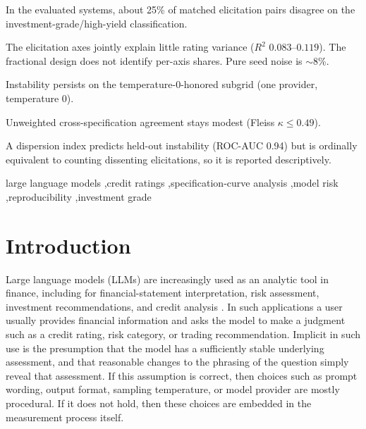 \documentclass[a4paper,fleqn]{cas-sc}
\begin{document}
\begin{highlights}
\item In the evaluated systems, about 25\% of matched elicitation pairs disagree on the investment-grade/high-yield classification.
\item The elicitation axes jointly explain little rating variance ($R^2$ $0.083$--$0.119$). The fractional design does not identify per-axis shares. Pure seed noise is $\sim$8\%.
\item Instability persists on the temperature-0-honored subgrid (one provider, temperature 0).
\item Unweighted cross-specification agreement stays modest (Fleiss $\kappa\le0.49$).
\item A dispersion index predicts held-out instability (ROC-AUC 0.94) but is ordinally equivalent to counting dissenting elicitations, so it is reported descriptively.
\end{highlights}

\begin{keywords}
large language models \sep credit ratings \sep specification-curve analysis \sep model risk \sep reproducibility \sep investment grade
\end{keywords}

\maketitle

\section{Introduction}
Large language models (LLMs) are increasingly used as an analytic tool in finance, including for
financial-statement interpretation, risk assessment, investment recommendations, and credit analysis
\citep{hens2025risk}. In such applications a user usually provides financial information and asks
the model to make a judgment such as a credit rating, risk category, or trading recommendation. Implicit
in such use is the presumption that the model has a sufficiently stable underlying assessment, and that
reasonable changes to the phrasing of the question simply reveal that assessment. If this assumption is
correct, then choices such as prompt wording, output format, sampling temperature, or model provider are
mostly procedural. If it does not hold, then these choices are embedded in the measurement process
itself.
\end{document}
